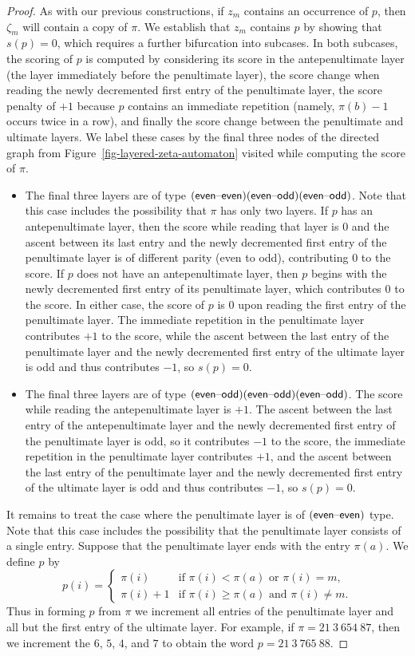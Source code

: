 \begin{proof}
	As with our previous constructions, if $z_m$ contains an occurrence of $p$, then $\zeta_m$ will contain a copy of $\pi$. We establish that $z_m$ contains $p$ by showing that $s(p)=0$, which requires a further bifurcation into subcases. In both subcases, the scoring of $p$ is computed by considering its score in the antepenultimate layer (the layer immediately before the penultimate layer), the score change when reading the newly decremented first entry of the penultimate layer, the score penalty of $+1$ because $p$ contains an immediate repetition (namely, $\pi(b)-1$ occurs twice in a row), and finally the score change between the penultimate and ultimate layers. We label these cases by the final three nodes of the directed graph from Figure~\ref{fig-layered-zeta-automaton} visited while computing the score of $\pi$.
	\begin{itemize}
		\item The final three layers are of type $(\textsf{even}\text{--}\textsf{even})(\textsf{even}\text{--}\textsf{odd})(\textsf{even}\text{--}\textsf{odd})$. Note that this case includes the possibility that $\pi$ has only two layers. If $p$ has an antepenultimate layer, then the score while reading that layer is $0$ and the ascent between its last entry and the newly decremented first entry of the penultimate layer is of different parity (even to odd), contributing $0$ to the score. If $p$ does not have an antepenultimate layer, then $p$ begins with the newly decremented first entry of its penultimate layer, which contributes $0$ to the score. In either case, the score of $p$ is $0$ upon reading the first entry of the penultimate layer. The immediate repetition in the penultimate layer contributes $+1$ to the score, while the ascent between the last entry of the penultimate layer and the newly decremented first entry of the ultimate layer is odd and thus contributes $-1$, so $s(p) = 0$.
		\item The final three layers are of type $(\textsf{even}\text{--}\textsf{odd})(\textsf{even}\text{--}\textsf{odd})(\textsf{even}\text{--}\textsf{odd})$. The score while reading the antepenultimate layer is $+1$. The ascent between the last entry of the antepenultimate layer and the newly decremented first entry of the penultimate layer is odd, so it contributes $-1$ to the score, the immediate repetition in the penultimate layer contributes $+1$, and the ascent between the last entry of the penultimate layer and the newly decremented first entry of the ultimate layer is odd and thus contributes $-1$, so $s(p) = 0$.
	\end{itemize}

	It remains to treat the case where the penultimate layer is of $(\textsf{even}\text{--}\textsf{even})$ type. Note that this case includes the possibility that the penultimate layer consists of a single entry. Suppose that the penultimate layer ends with the entry $\pi(a)$. We define $p$ by
	\[
		p(i)
		=
		\left\{\begin{array}{ll}
			\pi(i)   &\text{if $\pi(i)<\pi(a)$ or $\pi(i)=m$,}\\
			\pi(i)+1 &\text{if $\pi(i)\ge\pi(a)$ and $\pi(i)\neq m$.}
		\end{array}\right.
	\]
	Thus in forming $p$ from $\pi$ we increment all entries of the penultimate layer and all but the first entry of the ultimate layer. For example, if $\pi=21\ 3\ 654\ 87$, then we increment the $6$, $5$, $4$, and $7$ to obtain the word $p=21\ 3\ 765\ 88$.


\end{proof}
